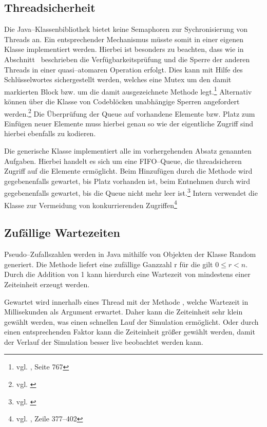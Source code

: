 
\subsection{Threadsicherheit} %
\label{sub:realisierung_mit_linkedblockingqueue}
Die Java–Klassenbibliothek bietet keine Semaphoren zur Sychronisierung von Threads an. Ein entsprechender Mechanismus müsste somit in einer eigenen Klasse implementiert werden. Hierbei ist besonders zu beachten, dass wie in Abschnitt~ beschrieben die Verfügbarkeitsprüfung und die Sperre der anderen Threads in einer quasi–atomaren Operation erfolgt. Dies kann mit Hilfe des Schlüsselwortes  sichergestellt werden, welches eine \ac{Mutex} um den damit markierten Block bzw. um die damit ausgezeichnete Methode legt.\footnote{vgl. \cite{javaorange}, Seite 767} Alternativ können über die Klasse  von Codeblöcken unabhängige Sperren angefordert werden.\footnote{vgl. \cite{javadoc:rl}} Die Überprüfung der Queue auf vorhandene Elemente bzw. Platz zum Einfügen neuer Elemente muss hierbei genau so wie der eigentliche Zugriff sind hierbei ebenfalls zu kodieren.

Die generische Klasse  implementiert alle im vorhergehenden Absatz genannten Aufgaben. Hierbei handelt es sich um eine FIFO–Queue, die threadsicheren Zugriff auf die Elemente ermöglicht. Beim Hinzufügen durch die Methode  wird gegebenenfalls gewartet, bis Platz vorhanden ist, beim Entnehmen durch  wird gegebenenfalls gewartet, bis die Queue nicht mehr leer ist.\footnote{vgl. \cite{javadoc:lbq}} Intern verwendet die Klasse  zur Vermeidung von konkurrierenden Zugriffen\footnote{vgl. \cite{javadoc:lbqsource}, Zeile 377–402}

\subsection{Zufällige Wartezeiten} %
\label{sub:zufall}
Pseudo–Zufallszahlen werden in Java mithilfe von Objekten der Klasse Random generiert. Die Methode  liefert eine zufällige Ganzzahl r für die gilt $0 \leq r < n$. Durch die Addition von 1 kann hierdurch eine Wartezeit von mindestens einer Zeiteinheit erzeugt werden.

Gewartet wird innerhalb eines Thread mit der Methode , welche Wartezeit in Millisekunden als Argument erwartet. Daher kann die Zeiteinheit sehr klein gewählt werden, was einen schnellen Lauf der Simulation ermöglicht. Oder durch einen entsprechenden Faktor kann die Zeiteinheit größer gewählt werden, damit der Verlauf der Simulation besser live beobachtet werden kann.


